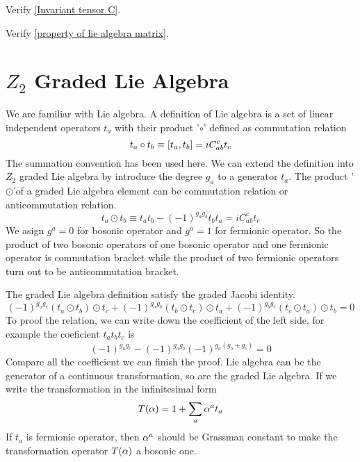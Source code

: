     \begin{Exe}\label{Exe:Invariant tensor C}
    	Verify \eqref{Invariant tensor C}.
    \end{Exe}
    
    \begin{Exe}\label{Exe:property of lie algebra matrix}
    	Verify \eqref{property of lie algebra matrix}.
    \end{Exe}
    
    
    
    \section{$Z_2$ Graded Lie Algebra}
    
    We are familiar with Lie algebra. A  definition of Lie algebra is a set of linear independent operators $t_a$ with their product '$\circ$' defined as commutation relation
    \begin{equation}
    t_a \circ t_b \equiv \comm{t_a}{t_b}=i C_{ab}^{c}t_c
    \end{equation}
    The summation convention has been used here. We can extend the definition into $Z_2$ graded Lie algebra by introduce the degree $g_a$ to a generator $t_a$. The product '$\odot$'of a graded Lie algebra element can be commutation relation or anticommutation relation. 
    \begin{equation}\label{definition of graded operator}
    t_a \odot t_b \equiv t_a t_b -(-1)^{g_a g_b} t_b t_a = i C^c_{ab}t_c
    \end{equation}
    We asign $g^a = 0$ for bosonic operator and $g^a = 1$ for fermionic operator. So the product of two bosonic operators of one bosonic operator and one fermionic operator is commutation bracket while the product of two fermionic operators turn out to be anticommutation bracket.  
    
    The graded Lie algebra definition satisfy the graded Jacobi identity.
    \begin{equation}
    (-1)^{g_a g_c} (t_a \odot t_b) \odot t_c 
    + (-1)^{g_a g_b} (t_b \odot t_c) \odot t_a  
    + (-1)^{g_b g_c} (t_c \odot t_a) \odot t_b
    =0
    \end{equation}
    To proof the relation, we can write down the coefficient of the left side, for example the coeficient $t_a t_b t_c$ is 
    \begin{equation}
    (-1)^{g_a g_c} - (-1)^{g_a g_b}(-1)^{g_a(g_b+g_c)} = 0
    \end{equation}
    Compare all the coefficient we can finish the proof. 
    Lie algebra can be the generator of a continuous transformation, so are the graded Lie algebra. If we write the transformation in the infinitesimal form
    \begin{equation}
    T(\alpha) = 1 + \sum_a \alpha^a t_a
    \end{equation}
    If $t_a$ is fermionic operator, then $\alpha^a$ should be  Grassman constant to make the transformation operator $T(\alpha)$ a bosonic one.
    
